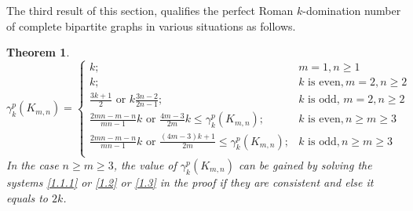 \documentclass[12pt]{amsart}
\newtheorem{theorem}{Theorem}[section]
\begin{document}
The third result of this section, qualifies the perfect Roman $k$-domination number of complete bipartite graphs in various situations as follows.
\begin{theorem}\label{thm3}
$$\gamma_k^p(K_{m,n})=\left\lbrace \begin{array}{ll}
k; & m=1, n\geq 1 \\ 
k; & k \textrm{ is even}, m=2, n\geq 2 \\
\frac{3k+1}{2} \textrm{ or } k\frac{3n-2}{2n-1}; &  k \textrm{ is odd, } m=2, n\geq 2 \\
\frac{2mn-m-n}{mn-1}k \textrm{ or } \frac{4m-3}{2m}k \leq \gamma_k^p(K_{m,n}); & k \textrm{ is even}, n\geq m\geq 3 \\
\frac{2mn-m-n}{mn-1}k \textrm{ or } \frac{(4m-3)k+1}{2m} \leq \gamma_k^p(K_{m,n}); & k \textrm{ is odd}, n\geq m\geq 3 \\
\end{array} \right.$$
In the case $n\geq m\geq 3$, the value of $\gamma_k^p(K_{m,n})$ can be gained by solving the systems \ref{1.1.1} or \ref{1.2} or \ref{1.3} in the proof if they are consistent and else it equals to $2k$.
\end{theorem}
\end{document}
